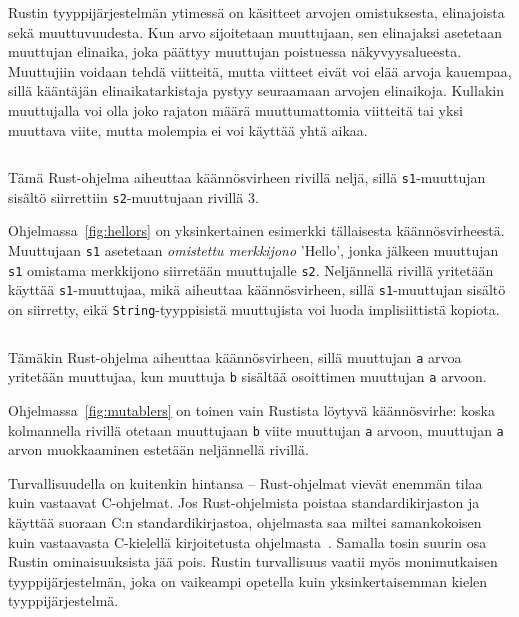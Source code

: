 Rustin tyyppijärjestelmän ytimessä on käsitteet arvojen
omistuksesta, elinajoista sekä
muuttuvuudesta. Kun arvo sijoitetaan muuttujaan, sen
elinajaksi asetetaan muuttujan elinaika, joka päättyy muuttujan poistuessa
näkyvyysalueesta. Muuttujiin voidaan tehdä viitteitä, mutta
viitteet eivät voi elää arvoja kauempaa, sillä kääntäjän
elinaikatarkistaja pystyy seuraamaan arvojen
elinaikoja. Kullakin muuttujalla voi olla joko rajaton määrä muuttumattomia
viitteitä tai yksi muuttava viite, mutta molempia ei voi käyttää yhtä aikaa.

\begin{listing}[ht!]
    \inputminted{Rust}{koodi/hello.rs}
    \caption{Tämä Rust-ohjelma aiheuttaa käännösvirheen rivillä neljä, sillä
    \texttt{s1}-muuttujan sisältö siirrettiin \texttt{s2}-muuttujaan rivillä
    3.}
    \label{fig:hellors}
\end{listing}

Ohjelmassa~\ref{fig:hellors} on yksinkertainen esimerkki tällaisesta
käännösvirheestä. Muuttujaan \texttt{s1} asetetaan \emph{omistettu merkkijono}
'Hello', jonka jälkeen muuttujan \texttt{s1} omistama merkkijono siirretään
muuttujalle \texttt{s2}. Neljännellä rivillä yritetään käyttää
\texttt{s1}-muuttujaa, mikä aiheuttaa käännösvirheen, sillä
\texttt{s1}-muuttujan sisältö on siirretty, eikä \texttt{String}-tyyppisistä
muuttujista voi luoda implisiittistä kopiota.

\begin{listing}[ht!]
    \inputminted{Rust}{koodi/mutable.rs}
    \caption{Tämäkin Rust-ohjelma aiheuttaa käännösvirheen, sillä muuttujan
    \texttt{a} arvoa yritetään muuttujaa, kun muuttuja \texttt{b} sisältää
    osoittimen muuttujan \texttt{a} arvoon.}
    \label{fig:mutablers}
\end{listing}

Ohjelmassa~\ref{fig:mutablers} on toinen vain Rustista löytyvä käännösvirhe:
koska kolmannella rivillä otetaan muuttujaan \texttt{b} viite muuttujan
\texttt{a} arvoon, muuttujan \texttt{a} arvon muokkaaminen estetään neljännellä
rivillä.

Turvallisuudella on kuitenkin hintansa -- Rust-ohjelmat vievät enemmän tilaa
kuin vastaavat C-ohjelmat. Jos Rust-ohjelmista poistaa standardikirjaston ja
käyttää suoraan C:n standardikirjastoa, ohjelmasta saa miltei samankokoisen
kuin vastaavasta C-kielellä kirjoitetusta ohjelmasta~\citep{rustbinarysize}.
Samalla tosin suurin osa Rustin ominaisuuksista jää pois. Rustin turvallisuus
vaatii myös monimutkaisen tyyppijärjestelmän, joka on vaikeampi opetella kuin
yksinkertaisemman kielen tyyppijärjestelmä.

